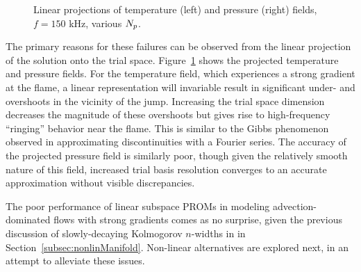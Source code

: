 \begin{figure}
\begin{minipage}{0.49\linewidth}
    \end{minipage}
    \caption{\label{fig:flameLinearProj}Linear projections of temperature (left) and pressure (right) fields, $f = 150$ kHz, various $N_p$.}
\end{figure}

The primary reasons for these failures can be observed from the linear projection of the solution onto the trial space. Figure~\ref{fig:flameLinearProj} shows the projected temperature and pressure fields. For the temperature field, which experiences a strong gradient at the flame, a linear representation will invariable result in significant under- and overshoots in the vicinity of the jump. Increasing the trial space dimension decreases the magnitude of these overshoots but gives rise to high-frequency ``ringing'' behavior near the flame. This is similar to the Gibbs phenomenon observed in approximating discontinuities with a Fourier series. The accuracy of the projected pressure field is similarly poor, though given the relatively smooth nature of this field, increased trial basis resolution converges to an accurate approximation without visible discrepancies.

The poor performance of linear subspace PROMs in modeling advection-dominated flows with strong gradients comes as no surprise, given the previous discussion of slowly-decaying Kolmogorov $n$-widths in in Section~\ref{subsec:nonlinManifold}. Non-linear alternatives are explored next, in an attempt to alleviate these issues.